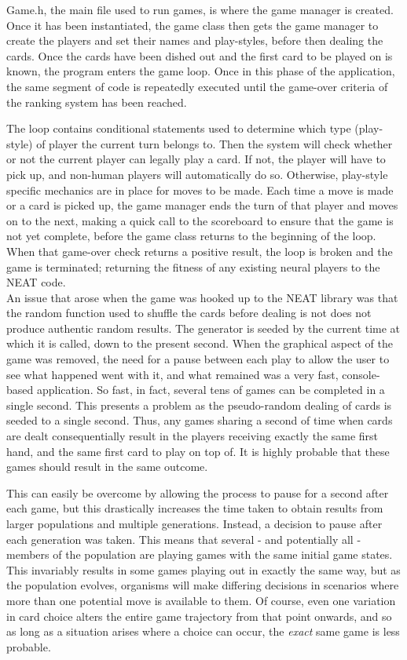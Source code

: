 \documentclass[12pt,a4paper]{article}
\begin{document}
Game.h, the main file used to run games, is where the game manager is created. Once it has been instantiated, the game class then gets the game manager to create the players and set their names and play-styles, before then dealing the cards. Once the cards have been dished out and the first card to be played on is known, the program enters the game loop. Once in this phase of the application, the same segment of code is repeatedly executed until the game-over criteria of the ranking system has been reached. 

The loop contains conditional statements used to determine which type (play-style) of player the current turn belongs to. Then the system will check whether or not the current player can legally play a card. If not, the player will have to pick up, and non-human players will automatically do so. Otherwise, play-style specific mechanics are in place for moves to be made. Each time a move is made or a card is picked up, the game manager ends the turn of that player and moves on to the next, making a quick call to the scoreboard to ensure that the game is not yet complete, before the game class returns to the beginning of the loop. When that game-over check returns a positive result, the loop is broken and the game is terminated; returning the fitness of any existing neural players to the NEAT code.\\

An issue that arose when the game was hooked up to the NEAT library was that the random function used to shuffle the cards before dealing is not does not produce authentic random results. The generator is seeded by the current time at which it is called, down to the present second. When the graphical aspect of the game was removed, the need for a pause between each play to allow the user to see what happened went with it, and what remained was a very fast, console-based application. So fast, in fact, several tens of games can be completed in a single second. This presents a problem as the pseudo-random dealing of cards is seeded to a single second. Thus, any games sharing a second of time when cards are dealt consequentially result in the players receiving exactly the same first hand, and the same first card to play on top of. It is highly probable that these games should result in the same outcome. 

This can easily be overcome by allowing the process to pause for a second after each game, but this drastically increases the time taken to obtain results from larger populations and multiple generations. Instead, a decision to pause after each generation was taken. This means that several - and potentially all - members of the population are playing games with the same initial game states. This invariably results in some games playing out in exactly the same way, but as the population evolves, organisms will make differing decisions in scenarios where more than one potential move is available to them. Of course, even one variation in card choice alters the entire game trajectory from that point onwards, and so as long as a situation arises where a choice can occur, the \textit{exact} same game is less probable. 
\end{document}
